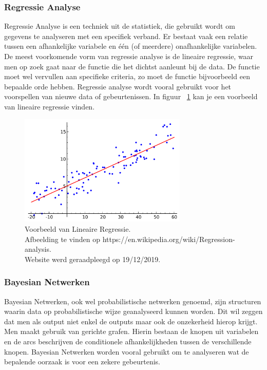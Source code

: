 	\subsubsection{Regressie Analyse}
	Regressie Analyse is een techniek uit de statistiek\cite{sieben2009logistische}, die gebruikt wordt om gegevens te analyseren met een specifiek verband. Er bestaat vaak een relatie tussen een afhankelijke variabele en \'e\'en (of meerdere) onafhankelijke variabelen. De meest voorkomende vorm van regressie analyse is de lineaire regressie, waar men op zoek gaat naar de functie die het dichtst aanleunt bij de data. De functie moet wel vervullen aan specifieke criteria, zo moet de functie bijvoorbeeld een bepaalde orde hebben. Regressie analyse wordt vooral gebruikt voor het voorspellen van nieuwe data of gebeurtenissen. In figuur ~\ref{fig:regressieAnalyse} kan je een voorbeeld van lineaire regressie vinden.
	\begin{figure}
		\centering
		\includegraphics[width=80mm]{afbeeldingen/regressieAnalyse.PNG}
		\caption{Voorbeeld van Lineaire Regressie. \\Afbeelding te vinden op https://en.wikipedia.org/wiki/Regression-analysis.\\ Website werd geraadpleegd op 19/12/2019.}
		\label{fig:regressieAnalyse}
		
	\end{figure}
	
	
	\subsubsection{Bayesian Netwerken}
	Bayesian Netwerken, ook wel probabilistische netwerken genoemd, zijn structuren waarin data op probabilistische wijze geanalyseerd kunnen worden. Dit wil zeggen dat men als output niet enkel de outputs maar ook de onzekerheid hierop krijgt. Men maakt gebruik van gerichte grafen. Hierin bestaan de knopen uit variabelen en de arcs beschrijven de conditionele afhankelijkheden tussen de verschillende knopen. Bayesian Netwerken worden vooral gebruikt om te analyseren wat de bepalende oorzaak is voor een zekere gebeurtenis. 
	

